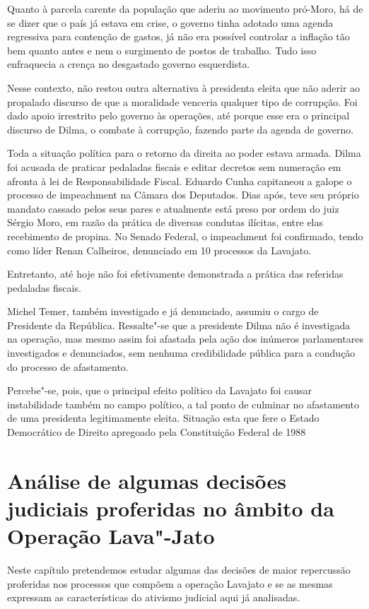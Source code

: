 {Quanto à parcela carente da população que aderiu ao movimento pró-Moro,
há de se dizer que o país já estava em crise, o governo tinha adotado
uma agenda regressiva para contenção de gastos, já não era possível
controlar a inflação tão bem quanto antes e nem o surgimento de postos
de trabalho. Tudo isso enfraquecia a crença no desgastado governo
esquerdista.

Nesse contexto, não restou outra alternativa à presidenta eleita que não
aderir ao propalado discurso de que a moralidade venceria qualquer tipo
de corrupção. Foi dado apoio irrestrito pelo governo às operações, até
porque esse era o principal discurso de Dilma, o combate à corrupção,
fazendo parte da agenda de governo.

Toda a situação política para o retorno da direita ao poder estava
armada. Dilma foi acusada de praticar pedaladas fiscais e editar
decretos sem numeração em afronta à lei de Responsabilidade Fiscal.
Eduardo Cunha capitaneou a galope o processo de impeachment na Câmara
dos Deputados. Dias após, teve seu próprio mandato cassado pelos seus
pares e atualmente está preso por ordem do juiz Sérgio Moro, em razão da
prática de diversas condutas ilícitas, entre elas recebimento de
propina. No Senado Federal, o impeachment foi confirmado, tendo como
líder Renan Calheiros, denunciado em 10 processos da Lavajato.

Entretanto, até hoje não foi efetivamente demonstrada a prática das
referidas pedaladas fiscais.

Michel Temer, também investigado e já denunciado, assumiu o cargo de
Presidente da República. Ressalte"-se que a presidente Dilma não é
investigada na operação, mas mesmo assim foi afastada pela ação dos
inúmeros parlamentares investigados e denunciados, sem nenhuma
credibilidade pública para a condução do processo de afastamento.

Percebe"-se, pois, que o principal efeito político da Lavajato foi causar
instabilidade também no campo político, a tal ponto de culminar no
afastamento de uma presidenta legitimamente eleita. Situação esta que
fere o Estado Democrático de Direito apregoado pela Constituição Federal
de 1988

\section{Análise de algumas decisões judiciais proferidas
no âmbito da Operação Lava"-Jato}

Neste capítulo pretendemos estudar algumas das decisões de maior
repercussão proferidas nos processos que compõem a operação Lavajato e
se as mesmas expressam as características do ativismo judicial aqui já
analisadas.

}
